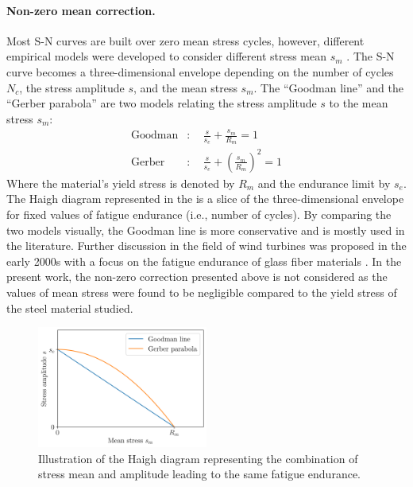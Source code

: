 \paragraph{Non-zero mean correction.}
Most S-N curves are built over zero mean stress cycles, however, different empirical models were developed to consider different stress mean $s_m$ \citep{suresh_1998_fatigue_book}. 
The S-N curve becomes a three-dimensional envelope depending on the number of cycles $N_c$, the stress amplitude $s$, and the mean stress $s_m$. 
The ``Goodman line'' and the ``Gerber parabola'' are two models relating the stress amplitude $s$ to the mean stress $s_m$:  
\begin{align}
    \mathrm{Goodman} &:\quad \frac{s}{s_e} + \frac{s_m}{R_m} = 1\\
    \mathrm{Gerber} &:\quad \frac{s}{s_e} + \left(\frac{s_m}{R_m}\right)^2 = 1
\end{align}
Where the material's yield stress is denoted by $R_m$ and the endurance limit by $s_e$. 
The Haigh diagram represented in the  is a slice of the three-dimensional envelope for fixed values of fatigue endurance (i.e., number of cycles). 
By comparing the two models visually, the Goodman line is more conservative and is mostly used in the literature. 
Further discussion in the field of wind turbines was proposed in the early 2000s with a focus on the fatigue endurance of glass fiber materials \citep{sutherland_2000_fatigueWT}. 
In the present work, the non-zero correction presented above is not considered as the values of mean stress were found to be negligible compared to the yield stress of the steel material studied. 

\begin{figure}
    \centering
    \includegraphics[width=0.5\textwidth]{../numerical_experiments/chapter2/figures/haigh_diagram.png}
    \caption{Illustration of the Haigh diagram representing the combination of stress mean and amplitude leading to the same fatigue endurance.}
    \label{fig:haigh_diagram}
\end{figure}



